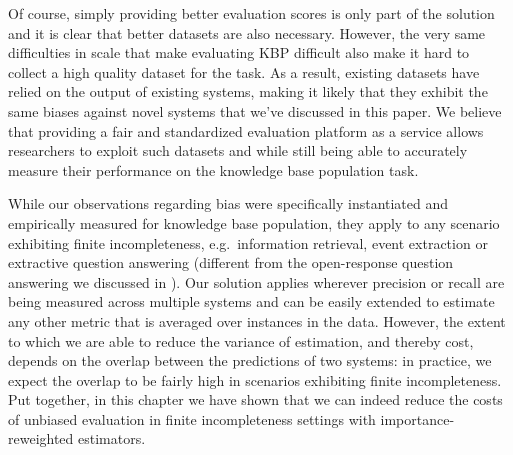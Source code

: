 Of course, simply providing better evaluation scores is only part of the solution and it is clear that better datasets are also necessary.
However, the very same difficulties in scale that make evaluating KBP difficult also make it hard to collect a high quality dataset for the task.
As a result, existing datasets \citep{angeli2014combining,adel2016comparing} have relied on the output of existing systems, making it likely that they exhibit the same biases against novel systems that we've discussed in this paper.
We believe that providing a fair and standardized evaluation platform as a service
allows researchers to exploit such datasets and while still being able to accurately measure their performance on the knowledge base population task.

While our observations regarding bias were specifically instantiated and empirically measured for knowledge base population, they apply to any scenario exhibiting finite incompleteness, e.g.\ information retrieval, event extraction or extractive question answering (different from the open-response question answering we discussed in ).
Our solution applies wherever precision or recall are being measured across multiple systems and can be easily extended to estimate any other metric that is averaged over instances in the data.
However, the extent to which we are able to reduce the variance of estimation, and thereby cost, depends on the overlap between the predictions of two systems: in practice, we expect the overlap to be fairly high in scenarios exhibiting finite incompleteness.
Put together, in this chapter we have shown that we can indeed reduce the costs of unbiased evaluation in finite incompleteness settings with importance-reweighted estimators.
